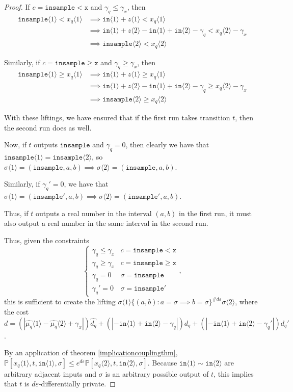 \documentclass[12pt]{article}
\newcommand{\PP}{\mathbb{P}}
\newcommand{\gguard}[1][x]{\texttt{insample}\geq #1}
\newcommand{\lguard}[1][x]{\texttt{insample} < #1}
\newcommand{\brangle}[1]{\langle #1 \rangle}
\theoremstyle{definition}
\begin{document}
\begin{proof}
If $c=\lguard[\texttt{x}]$ and $\gamma_q\leq \gamma_x$, then \begin{align*}
    \texttt{insample}\brangle{1}<x_q\brangle{1}&\implies \texttt{in}\brangle{1}+z\brangle{1}<x_q\brangle{1}\\
    &\implies \texttt{in}\brangle{1}+z\brangle{2}-\texttt{in}\brangle{1}+\texttt{in}\brangle{2}-\gamma_q<x_q\brangle{2}-\gamma_x\\
    &\implies \texttt{insample}\brangle{2}<x_q\brangle{2}
\end{align*}

Similarly, if $c=\gguard[\texttt{x}]$ and $\gamma_q\geq \gamma_x$, then \begin{align*}
    \texttt{insample}\brangle{1}\geq x_q\brangle{1}&\implies \texttt{in}\brangle{1}+z\brangle{1}\geq x_q\brangle{1}\\
    &\implies \texttt{in}\brangle{1}+z\brangle{2}-\texttt{in}\brangle{1}+\texttt{in}\brangle{2}-\gamma_q\geq x_q\brangle{2}-\gamma_x\\
    &\implies \texttt{insample}\brangle{2}\geq x_q\brangle{2}
\end{align*}

With these liftings, we have ensured that if the first run takes transition $t$, then the second run does as well. 

Now, if $t$ outputs $\texttt{insample}$ and $\gamma_q=0$, then clearly we have that $\texttt{insample}\brangle{1}=\texttt{insample}\brangle{2}$, so $\sigma\brangle{1} = (\texttt{insample}, a, b)\implies \sigma\brangle{2}=(\texttt{insample}, a, b)$.

Similarly, if $\gamma_q'=0$, we have that $\sigma\brangle{1} = (\texttt{insample}', a, b)\implies \sigma\brangle{2}=(\texttt{insample}', a, b)$. 

Thus, if $t$ outputs a real number in the interval $(a, b)$ in the first run, it must also output a real number in the same interval in the second run. 

Thus, given the constraints \[
  \begin{cases}
    \gamma_q\leq\gamma_x & c = \lguard[\texttt{x}]\\
    \gamma_q\geq\gamma_x & c = \gguard[\texttt{x}]\\
    \gamma_q=0 & \sigma = \texttt{insample}\\
    \gamma_q'=0 & \sigma = \texttt{insample}'
  \end{cases},
\]
this is sufficient to create the lifting $\sigma\brangle{1}\{(a, b): a=\sigma\implies b=\sigma\}^{\#d\varepsilon}\sigma\brangle{2}$, where the cost $d = (|\hat{\mu_q}\brangle{1}-\hat{\mu_q}\brangle{2}+\gamma_x|)\hat{d_q}+(|-\texttt{in}\brangle{1}+\texttt{in}\brangle{2}-\gamma_q|)d_q+(|-\texttt{in}\brangle{1}+\texttt{in}\brangle{2}-\gamma_q'|)d_q'$. 

By an application of theorem \ref{implicationcouplingthm}, $\PP[x_q\brangle{1}, t, \texttt{in}\brangle{1}, \sigma]\leq e^{d\varepsilon}\PP[x_q\brangle{2}, t, \texttt{in}\brangle{2}, \sigma]$. Because $\texttt{in}\brangle{1}\sim\texttt{in}\brangle{2}$ are arbitrary adjacent inputs and $\sigma$ is an arbitrary possible output of $t$, this implies that $t$ is $d\varepsilon$-differentially private. 
\end{proof}
\end{document}
